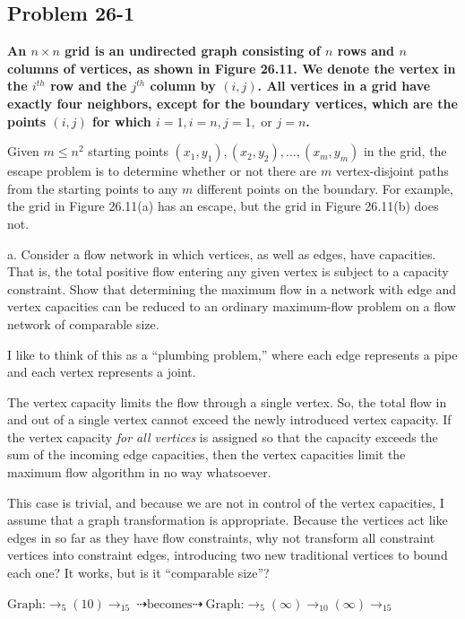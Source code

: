 \documentclass[10pt,fullpage]{article}
\begin{document}
\newpage

\subsection*{Problem 26-1}

{ \bf An $n \times n$ grid is an undirected graph consisting of $n$
rows and $n$ columns of vertices, as shown in Figure 26.11. We
denote the vertex in the $i^{th}$ row and the $j^{th}$ column by
$(i, j)$. All vertices in a grid have exactly four neighbors, except
for the boundary vertices, which are the points $(i, j)$ for which
$i = 1, i = n, j = 1, \text{ or } j = n$.

Given $m \leq n^2$ starting points $(x_1, y_1), (x_2, y_2),
...,(x_m, y_m)$ in the grid, the escape problem is to determine
whether or not there are $m$ vertex-disjoint paths from the starting
points to any $m$ different points on the boundary. For example, the
grid in Figure 26.11(a) has an escape, but the grid in Figure
26.11(b) does not.

\noindent a. Consider a flow network in which vertices, as well as
edges, have capacities. That is, the total positive flow entering
any given vertex is subject to a capacity constraint. Show that
determining the maximum flow in a network with edge and vertex
capacities can be reduced to an ordinary maximum-flow problem on a
flow network of comparable size. }

I like to think of this as a ``plumbing problem,'' where each edge
represents a pipe and each vertex represents a joint.

The vertex capacity limits the flow through a single vertex. So, the
total flow in and out of a single vertex cannot exceed the newly
introduced vertex capacity. If the vertex capacity {\em for all
vertices } is assigned so that the capacity exceeds the sum of the
incoming edge capacities, then the vertex capacities limit the
maximum flow algorithm in no way whatsoever.

This case is trivial, and because we are not in control of the
vertex capacities, I assume that a graph transformation is
appropriate. Because the vertices act like edges in so far as they
have flow constraints, why not transform all constraint vertices
into constraint edges, introducing two new traditional vertices to
bound each one? It works, but is it ``comparable size''?

$\text{Graph:} \rightarrow_5( 10 )\rightarrow_{15} \ \dashrightarrow\text{becomes}\dashrightarrow \ \text{Graph:} \rightarrow_5(\infty)\rightarrow_{10}(\infty)\rightarrow_{15}$\\
\end{document}
